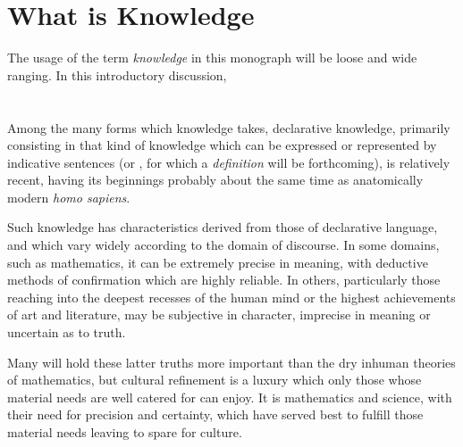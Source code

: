 \section{What is Knowledge}

The usage of the term \emph{knowledge} in this monograph will be loose and wide ranging.
In this introductory discussion, 


\section{}

Among the many forms which knowledge takes, declarative knowledge, primarily consisting in that kind of knowledge which can be expressed or represented by indicative sentences (or , for which a \emph{definition} will be forthcoming), is relatively recent, having its beginnings probably about the same time as anatomically modern \emph{homo sapiens}.

Such knowledge has characteristics derived from those of declarative language, and which vary widely according to the domain of discourse.
In some domains, such as mathematics, it can be extremely precise in meaning, with deductive methods of confirmation which are highly reliable.
In others, particularly those reaching into the deepest recesses of the human mind or the highest achievements of art and literature, may be subjective in character, imprecise in meaning or uncertain as to truth.

Many will hold these latter truths more important than the dry inhuman theories of mathematics, but cultural refinement is a luxury which only those whose material needs are well catered for can enjoy.
It is mathematics and science, with their need for precision and certainty, which have served best to fulfill those material needs leaving to spare for culture.


